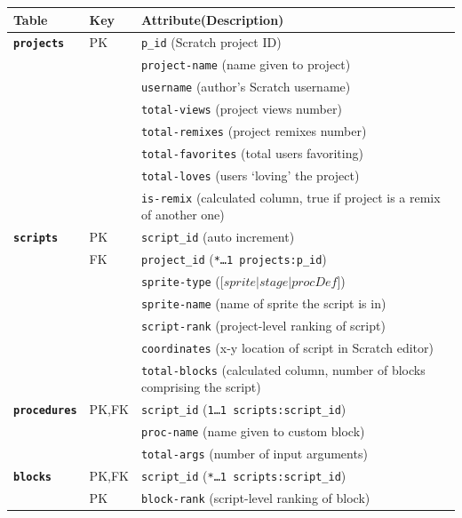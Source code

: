 \documentclass[10pt, conference]{IEEEtran}
\begin{document}
\begin{table}[]
	\centering
	\begin{tabular}{llp{5.4cm}}
		\textbf{Table}& \textbf{Key} & \textbf{Attribute(Description)}\\
		\hline
		\textbf{\texttt{projects}} & PK & \texttt{p\_id} (Scratch project ID)\\
		&  & 							\texttt{project-name} (name given to project)\\
		&  & 							\texttt{username} (author's Scratch 
		username)\\
		&  & 							\texttt{total-views} (project views number)\\
		&  & 							\texttt{total-remixes} (project remixes number)\\
		&  & 							\texttt{total-favorites} (total users favoriting)\\
		&  & 							\texttt{total-loves} (users `loving' the project)\\
		& & 							\texttt{is-remix} (calculated column, true if project is a remix of another one)\\
		\hline
		\textbf{\texttt{scripts}} & PK & \texttt{script\_id} (auto increment)\\
		& FK & 							\texttt{project\_id} (\texttt{\scriptsize{*\ldots1 projects:p\_id}})\\
		& & 							\texttt{sprite-type} ([$sprite \vert stage \vert procDef$])\\
		& & 							\texttt{sprite-name} (name of sprite the script is in)\\
		& & 							\texttt{script-rank} (project-level ranking of script)\\
		& & 							\texttt{coordinates} (x-y location of script in Scratch editor)\\
		& & 							\texttt{total-blocks} (calculated column, number of blocks comprising the script)\\
		\hline
		\textbf{\texttt{procedures}} & PK,FK & \texttt{script\_id} (\texttt{\scriptsize{1\ldots1 scripts:script\_id}})\\
		& & 							\texttt{proc-name} (name given to custom block)\\
		& & 							\texttt{total-args} (number of input arguments)\\
		\hline
		\textbf{\texttt{blocks}} & PK,FK  & \texttt{script\_id} (\texttt{\scriptsize{*\ldots1 scripts:script\_id}})\\
		& PK & \texttt{block-rank} (script-level ranking of block)\\

\end{tabular}
\end{table}
\end{document}
